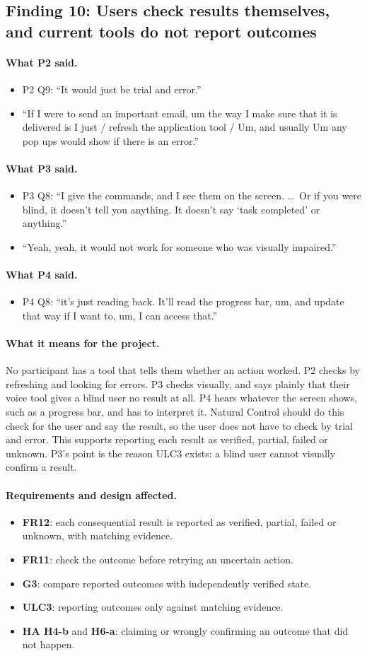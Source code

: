\documentclass[12pt, titlepage]{article}
\newcommand{\saidtwo}{\paragraph{What P2 said.}}
\newcommand{\saidthree}{\paragraph{What P3 said.}}
\newcommand{\saidfour}{\paragraph{What P4 said.}}
\newcommand{\means}{\paragraph{What it means for the project.}}
\newcommand{\affects}{\paragraph{Requirements and design affected.}}
\begin{document}
\subsection{Finding 10: Users check results themselves, and current tools do not report outcomes}

\saidtwo
\begin{itemize}
    \item P2 Q9: ``It would just be trial and error.''
    \item ``If I were to send an important email, um the way I make sure that it is delivered is I just / refresh the application tool / Um, and usually Um any pop ups would show if there is an error.''
\end{itemize}

\saidthree
\begin{itemize}
    \item P3 Q8: ``I give the commands, and I see them on the screen. \ldots\ Or if you were blind, it doesn't tell you anything. It doesn't say `task completed' or anything.''
    \item ``Yeah, yeah, it would not work for someone who was visually impaired.''
\end{itemize}

\saidfour
\begin{itemize}
    \item P4 Q8: ``it's just reading back. It'll read the progress bar, um, and update that way if I want to, um, I can access that.''
\end{itemize}

\means
No participant has a tool that tells them whether an action worked. P2 checks by refreshing and looking for errors. P3 checks visually, and says plainly that their voice tool gives a blind user no result at all. P4 hears whatever the screen shows, such as a progress bar, and has to interpret it. Natural Control should do this check for the user and say the result, so the user does not have to check by trial and error. This supports reporting each result as verified, partial, failed or unknown. P3's point is the reason ULC3 exists: a blind user cannot visually confirm a result.

\affects
\begin{itemize}
    \item \textbf{FR12}: each consequential result is reported as verified, partial, failed or unknown, with matching evidence.
    \item \textbf{FR11}: check the outcome before retrying an uncertain action.
    \item \textbf{G3}: compare reported outcomes with independently verified state.
    \item \textbf{ULC3}: reporting outcomes only against matching evidence.
    \item \textbf{HA H4-b} and \textbf{H6-a}: claiming or wrongly confirming an outcome that did not happen.
\end{itemize}
\end{document}

